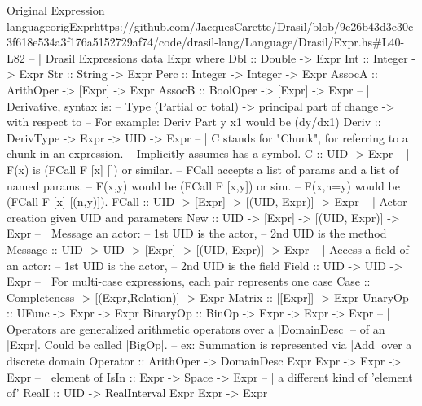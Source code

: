 \begin{haskell}{Original Expression language}{origExpr}{https://github.com/JacquesCarette/Drasil/blob/9c26b43d3e30c3f618e534a3f176a5152729af74/code/drasil-lang/Language/Drasil/Expr.hs\#L40-L82}
-- | Drasil Expressions
data Expr where
  Dbl      :: Double -> Expr
  Int      :: Integer -> Expr
  Str      :: String -> Expr
  Perc     :: Integer -> Integer -> Expr
  AssocA   :: ArithOper -> [Expr] -> Expr
  AssocB   :: BoolOper  -> [Expr] -> Expr
  -- | Derivative, syntax is:
  --   Type (Partial or total) -> principal part of change -> with respect to
  --   For example: Deriv Part y x1 would be (dy/dx1)
  Deriv    :: DerivType -> Expr -> UID -> Expr
  -- | C stands for "Chunk", for referring to a chunk in an expression.
  --   Implicitly assumes has a symbol.
  C        :: UID -> Expr
  -- | F(x) is (FCall F [x] []) or similar.
  --   FCall accepts a list of params and a list of named params.
  --   F(x,y) would be (FCall F [x,y]) or sim.
  --   F(x,n=y) would be (FCall F [x] [(n,y)]).
  FCall    :: UID -> [Expr] -> [(UID, Expr)] -> Expr
  -- | Actor creation given UID and parameters 
  New      :: UID -> [Expr] -> [(UID, Expr)] -> Expr 
  -- | Message an actor: 
  --   1st UID is the actor, 
  --   2nd UID is the method
  Message  :: UID -> UID -> [Expr] -> [(UID, Expr)] -> Expr
  -- | Access a field of an actor:
  --   1st UID is the actor,
  --   2nd UID is the field
  Field :: UID -> UID -> Expr
  -- | For multi-case expressions, each pair represents one case
  Case     :: Completeness -> [(Expr,Relation)] -> Expr
  Matrix   :: [[Expr]] -> Expr
  UnaryOp  :: UFunc -> Expr -> Expr
  BinaryOp :: BinOp -> Expr -> Expr -> Expr
  -- | Operators are generalized arithmetic operators over a |DomainDesc|
  --   of an |Expr|.  Could be called |BigOp|.
  --   ex: Summation is represented via |Add| over a discrete domain
  Operator :: ArithOper -> DomainDesc Expr Expr -> Expr -> Expr
  -- | element of
  IsIn     :: Expr -> Space -> Expr 
  -- | a different kind of 'element of'
  RealI    :: UID -> RealInterval Expr Expr -> Expr 
\end{haskell}
